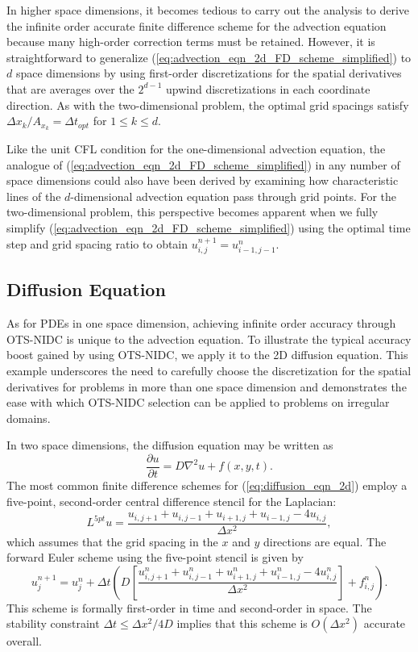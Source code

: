 \documentclass[fleqn,12pt,twoside]{article}
\newcommand{\beq}{\begin{equation}}
\newcommand{\eeq}{\end{equation}}
\def\pt{\partial t}
\def\dt{\Delta t}
\def\dx{\Delta x}
\begin{document}
In higher space dimensions, it becomes tedious to carry out the analysis 
to derive the infinite order accurate finite difference scheme for the 
advection equation because many high-order correction terms must be retained.  
However, it is straightforward to generalize 
(\ref{eq:advection_eqn_2d_FD_scheme_simplified}) to $d$ space dimensions by 
using first-order discretizations for the spatial derivatives that are 
averages over the $2^{d-1}$ upwind discretizations in each coordinate 
direction.   As with the two-dimensional problem, the optimal grid spacings 
satisfy $\dx_k/A_{x_k} = \dt_{opt}$ for $1 \le k \le d$.

Like the unit CFL condition for the one-dimensional advection equation, the 
analogue of (\ref{eq:advection_eqn_2d_FD_scheme_simplified}) in any number
of space dimensions could also have been derived by examining how 
characteristic lines of the $d$-dimensional advection equation pass 
through grid points.  For the two-dimensional problem, this perspective 
becomes apparent when we fully simplify 
(\ref{eq:advection_eqn_2d_FD_scheme_simplified}) using the 
optimal time step and grid spacing ratio to obtain
$u^{n+1}_{i,j} = u^{n}_{i-1,j-1}$.



\subsection{Diffusion Equation \label{sec:diffusion_eqn_2d}}
As for PDEs in one space dimension, achieving infinite order accuracy 
through OTS-NIDC is unique to the advection equation.
To illustrate the typical accuracy boost gained by using OTS-NIDC,
we apply it to the 2D diffusion equation.  This example underscores 
the need to carefully choose the discretization for the spatial derivatives 
for problems in more than one space dimension and demonstrates the ease with 
which OTS-NIDC selection can be applied to problems on irregular domains.

In two space dimensions, the diffusion equation may be written as
\beq
  \frac{\partial u}{\pt} = D \nabla^2 u + f(x,y,t).
  \label{eq:diffusion_eqn_2d}
\eeq
The most common finite difference schemes for (\ref{eq:diffusion_eqn_2d}) 
employ a five-point, second-order central difference stencil for the 
Laplacian:
\beq
  L^{5pt} u = \frac{u_{i,j+1} + u_{i,j-1}
                   +u_{i+1,j} + u_{i-1,j} - 4u_{i,j}}{\dx^2},
  \label{eq:laplacian_2d_5pt_stencil}
\eeq
which assumes that the grid spacing in the $x$ and $y$ directions are
equal.  The forward Euler scheme using the five-point stencil is given by
\beq
  u^{n+1}_j = u^{n}_j 
  + \dt 
    \left( D \left[\frac{u^{n}_{i,j+1} + u^{n}_{i,j-1}
             +u^{n}_{i+1,j} + u^{n}_{i-1,j} - 4u^{n}_{i,j}}{\dx^2} \right]
         + f_{i,j}^n
    \right).
  \label{eq:diffusion_eqn_2d_5pt_scheme}
\eeq
This scheme is formally first-order in time and second-order in space.  
The stability constraint $\dt \le \dx^2/4D$ implies that this scheme is
$O(\dx^2)$ accurate overall.
\end{document}
